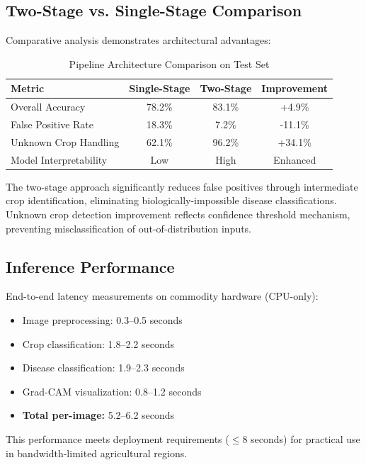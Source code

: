 \documentclass[conference]{IEEEtran}
\begin{document}
\subsection{Two-Stage vs. Single-Stage Comparison}

Comparative analysis demonstrates architectural advantages:

\begin{table}[H]
\centering
\renewcommand{\arraystretch}{1.3}
\begin{tabular}{|l|c|c|c|}
\hline
\textbf{Metric} & \textbf{Single-Stage} & \textbf{Two-Stage} & \textbf{Improvement} \\
\hline
Overall Accuracy & 78.2\% & 83.1\% & +4.9\% \\
False Positive Rate & 18.3\% & 7.2\% & -11.1\% \\
Unknown Crop Handling & 62.1\% & 96.2\% & +34.1\% \\
Model Interpretability & Low & High & Enhanced \\
\hline
\end{tabular}
\caption{Pipeline Architecture Comparison on Test Set}
\label{tab:comparison}
\end{table}

The two-stage approach significantly reduces false positives through intermediate crop identification, eliminating biologically-impossible disease classifications. Unknown crop detection improvement reflects confidence threshold mechanism, preventing misclassification of out-of-distribution inputs.

\subsection{Inference Performance}

End-to-end latency measurements on commodity hardware (CPU-only):

\begin{itemize}
\item Image preprocessing: 0.3--0.5 seconds
\item Crop classification: 1.8--2.2 seconds
\item Disease classification: 1.9--2.3 seconds
\item Grad-CAM visualization: 0.8--1.2 seconds
\item \textbf{Total per-image:} 5.2--6.2 seconds
\end{itemize}

This performance meets deployment requirements ($\leq 8$ seconds) for practical use in bandwidth-limited agricultural regions.
\end{document}
